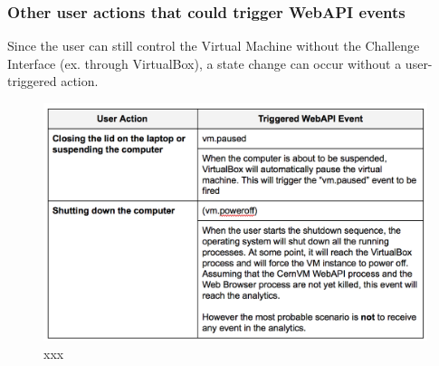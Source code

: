 \documentclass{article}
\begin{document}
\subsubsection{Other user actions that could trigger WebAPI events}

Since the user can still control the Virtual Machine without the Challenge Interface (ex. through VirtualBox), a state change can occur without a user-triggered action.


\begin{figure}[t]
  \begin{center}
		\includegraphics[width=\columnwidth]{imgs/userActions-webAPIEventsTable.png}
  \end{center}
\caption{xxx}
\label{xxx}
\end{figure}









      
      
\end{document}
